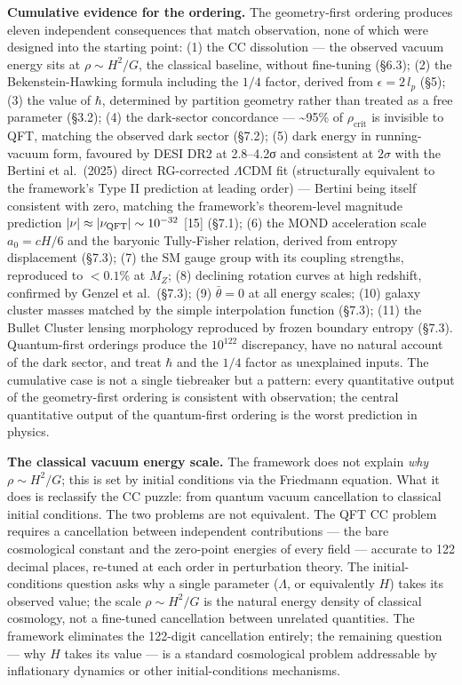 \documentclass[
]{article}
\begin{document}
\textbf{Cumulative evidence for the ordering.} The geometry-first
ordering produces eleven independent consequences that match
observation, none of which were designed into the starting point: (1)
the CC dissolution --- the observed vacuum energy sits at
\(\rho \sim H^2/G\), the classical baseline, without fine-tuning (§6.3);
(2) the Bekenstein-Hawking formula including the \(1/4\) factor, derived
from \(\epsilon = 2\,l_p\) (§5); (3) the value of \(\hbar\), determined
by partition geometry rather than treated as a free parameter (§3.2);
(4) the dark-sector concordance --- \textasciitilde95\% of
\(\rho_{\text{crit}}\) is invisible to QFT, matching the observed dark
sector (§7.2); (5) dark energy in running-vacuum form, favoured by DESI
DR2 at 2.8--4.2σ and consistent at \(2\sigma\) with the Bertini et
al.~(2025) direct RG-corrected \(\Lambda\)CDM fit (structurally
equivalent to the framework's Type II prediction at leading order) ---
Bertini being itself consistent with zero, matching the framework's
theorem-level magnitude prediction
\(|\nu| \approx |\nu_{\rm QFT}| \sim 10^{-32}\) {[}15{]} (§7.1); (6) the
MOND acceleration scale \(a_0 = cH/6\) and the baryonic Tully-Fisher
relation, derived from entropy displacement (§7.3); (7) the SM gauge
group with its coupling strengths, reproduced to \(< 0.1\%\) at \(M_Z\);
(8) declining rotation curves at high redshift, confirmed by Genzel et
al.~(§7.3); (9) \(\bar{\theta} = 0\) at all energy scales; (10) galaxy
cluster masses matched by the simple interpolation function (§7.3); (11)
the Bullet Cluster lensing morphology reproduced by frozen boundary
entropy (§7.3). Quantum-first orderings produce the \(10^{122}\)
discrepancy, have no natural account of the dark sector, and treat
\(\hbar\) and the \(1/4\) factor as unexplained inputs. The cumulative
case is not a single tiebreaker but a pattern: every quantitative output
of the geometry-first ordering is consistent with observation; the
central quantitative output of the quantum-first ordering is the worst
prediction in physics.

\textbf{The classical vacuum energy scale.} The framework does not
explain \emph{why} \(\rho \sim H^2/G\); this is set by initial
conditions via the Friedmann equation. What it does is reclassify the CC
puzzle: from quantum vacuum cancellation to classical initial
conditions. The two problems are not equivalent. The QFT CC problem
requires a cancellation between independent contributions --- the bare
cosmological constant and the zero-point energies of every field ---
accurate to 122 decimal places, re-tuned at each order in perturbation
theory. The initial-conditions question asks why a single parameter
(\(\Lambda\), or equivalently \(H\)) takes its observed value; the scale
\(\rho \sim H^2/G\) is the natural energy density of classical
cosmology, not a fine-tuned cancellation between unrelated quantities.
The framework eliminates the 122-digit cancellation entirely; the
remaining question --- why \(H\) takes its value --- is a standard
cosmological problem addressable by inflationary dynamics or other
initial-conditions mechanisms.
\end{document}
